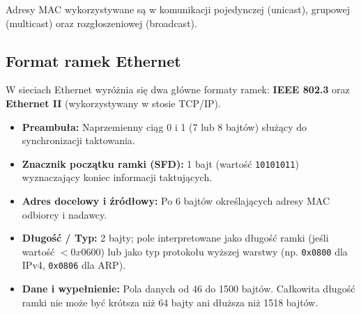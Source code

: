 \documentclass[11pt,a4paper]{article}
\begin{document}
Adresy MAC wykorzystywane są w komunikacji pojedynczej (unicast), grupowej (multicast) oraz rozgłoszeniowej (broadcast).

\subsection{Format ramek Ethernet}
W sieciach Ethernet wyróżnia się dwa główne formaty ramek: \textbf{IEEE 802.3} oraz \textbf{Ethernet II} (wykorzystywany w stosie TCP/IP).

\begin{itemize}[noitemsep]
    \item \textbf{Preambuła:} Naprzemienny ciąg 0 i 1 (7 lub 8 bajtów) służący do synchronizacji taktowania.
    \item \textbf{Znacznik początku ramki (SFD):} 1 bajt (wartość \texttt{10101011}) wyznaczający koniec informacji taktujących.
    \item \textbf{Adres docelowy i źródłowy:} Po 6 bajtów określających adresy MAC odbiorcy i nadawcy.
    \item \textbf{Długość / Typ:} 2 bajty; pole interpretowane jako długość ramki (jeśli wartość $< 0x0600$) lub jako typ protokołu wyższej warstwy (np. \texttt{0x0800} dla IPv4, \texttt{0x0806} dla ARP).
    \item \textbf{Dane i wypełnienie:} Pola danych od 46 do 1500 bajtów. Całkowita długość ramki nie może być krótsza niż 64 bajty ani dłuższa niż 1518 bajtów.
\end{itemize}
\end{document}
